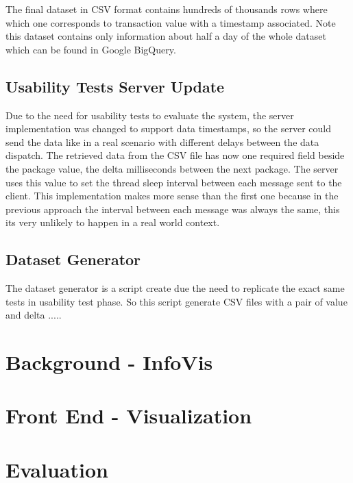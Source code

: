 \documentclass[letterpaper, 10 pt, conference]{ieeeconf}  %
\begin{document}
The final dataset in CSV format contains hundreds of thousands rows where which one corresponds to transaction value with a timestamp associated. Note this dataset contains only information about half a day of the whole dataset which can be found in Google BigQuery.

\subsection{Usability Tests Server Update}
\label{subsection:usabilityTests}
Due to the need for usability tests to evaluate the system, the server implementation was changed to support data timestamps, so the server could send the data like in a real scenario with different delays between the data dispatch. The retrieved data from the CSV file has now one required field beside the package value, the delta milliseconds between the next package. The server uses this value to set the thread sleep interval between each message sent to the client. This implementation makes more sense than the first one because in the previous approach the interval between each message was always the same, this its very unlikely to happen in a real world context.

\subsection{Dataset Generator}
\label{subsection:datasetGenerator}
The dataset generator is a script create due the need to replicate the exact same tests in usability test phase. So this script generate CSV files with a pair of value and delta .....


\section{Background - InfoVis}
\label{section:background}



\section{Front End - Visualization}
\label{section:frontend}

\section{Evaluation}
\label{section:evaluation}
\end{document}
